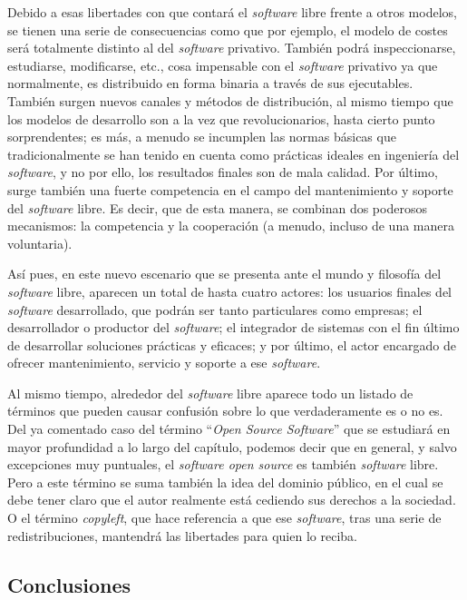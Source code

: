 Debido a esas libertades con que contará el \textit{software} libre frente a
otros modelos, se tienen una serie de consecuencias como que por ejemplo, el
modelo de costes será totalmente distinto al del \textit{software} privativo.
También podrá inspeccionarse, estudiarse, modificarse, etc., cosa impensable
con el \textit{software} privativo ya que normalmente, es distribuido en forma
binaria a través de sus ejecutables. También surgen nuevos canales y métodos de
distribución, al mismo tiempo que los modelos de desarrollo son a la vez que
revolucionarios, hasta cierto punto sorprendentes; es más, a menudo se incumplen
las normas básicas que tradicionalmente se han tenido en cuenta como prácticas
ideales en ingeniería del \textit{software}, y no por ello, los resultados
finales son de mala calidad. Por último, surge también una fuerte competencia
en el campo del mantenimiento y soporte del \textit{software} libre. Es decir,
que de esta manera, se combinan dos poderosos mecanismos: la competencia y la
cooperación (a menudo, incluso de una manera voluntaria).

Así pues, en este nuevo escenario que se presenta ante el mundo y filosofía del
\textit{software} libre, aparecen un total de hasta cuatro actores: los usuarios
finales del \textit{software} desarrollado, que podrán ser tanto particulares
como empresas; el desarrollador o productor del \textit{software}; el integrador
de sistemas con el fin último de desarrollar soluciones prácticas y eficaces; y
por último, el actor encargado de ofrecer mantenimiento, servicio y soporte a
ese \textit{software}.

Al mismo tiempo, alrededor del \textit{software} libre aparece todo un listado
de términos que pueden causar confusión sobre lo que verdaderamente es o no es. Del ya
comentado caso del término ``\textit{Open Source Software}'' que se estudiará en
mayor profundidad a lo largo del capítulo, podemos decir que en general, y salvo
excepciones muy puntuales, el \textit{software open source} es también
\textit{software} libre. Pero a este término se suma también la idea del
dominio público, en el cual se debe tener claro que el autor realmente está
cediendo sus derechos a la sociedad. O el término \textit{copyleft}, que hace
referencia a que ese \textit{software}, tras una serie de redistribuciones,
mantendrá las libertades para quien lo reciba.

\subsection{Conclusiones}

